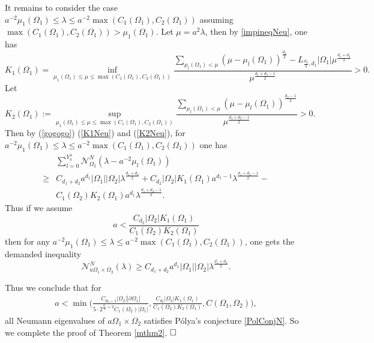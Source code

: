 \documentclass[11pt,letterpaper]{amsart}
\numberwithin{equation}{section}
\theoremstyle{plain}
\theoremstyle{plain}
\numberwithin{equation}{section}
\theoremstyle{remark}
\begin{document}
	
	It remains to consider the case $a^{-2} \mu_1(\Omega_1)\le \lambda\le a^{-2}\max(C_1(\Omega_1), C_2(\Omega_1))$ assuming $\max(C_1(\Omega_1), C_2(\Omega_1))> \mu_1(\Omega_1)$.
	Let $\mu= a^2\lambda$, then by \eqref{impineqNeu}, one has
	\begin{equation} \label{K1Neu}
		K_1(\Omega_1)= \inf_{\mu_1(\Omega_1)\le \mu\le \max(C_1(\Omega_1), C_2(\Omega_1))}\frac{\underset{\mu_l(\Omega_1)<\mu}{\sum}(\mu- \mu_l(\Omega_1))^{\frac{d_2}{2}}- L_{\frac{d_2}{2},d_1} |\Omega_1| \mu^{\frac{d_1+d_2}{2}}}{\mu^{\frac{d_1+d_2-1}{2}}}>0.
	\end{equation} 
	Let 
	\begin{equation} \label{K2Neu}
		K_2(\Omega_1):= \sup_{\mu_1(\Omega_1)\le \mu\le \max(C_1(\Omega_1), C_2(\Omega_1))} \frac{\underset{\mu_l(\Omega_1)<\mu}{\sum}(\mu- \mu_l(\Omega_1))^{\frac{d_2-1}{2}}}{\mu^{\frac{d_1+d_2-1}{2}}}>0.
	\end{equation}
	Then by (\ref{gogogo}) (\ref{K1Neu}) and (\ref{K2Neu}), for $a^{-2} \mu_1(\Omega_1)\le \lambda\le a^{-2}\max(C_1(\Omega_1), C_2(\Omega_1))$ one has 
	\[
	\begin{aligned}
		&\sum_{l=0}^{Y_a^\lambda} \mathcal N^N_{\Omega_2} (\lambda- a^{-2}\mu_l(\Omega_1))\\
		\ge&C_{d_1+d_2}a^{d_1}|\Omega_1||\Omega_2|\lambda^{\frac{d_1+d_2}{2}}+ C_{d_2}|\Omega_2| K_1(\Omega_1) a^{d_1-1} \lambda^{\frac{d_1+d_2-1}{2}}-\\
		&C_1(\Omega_2)K_2(\Omega_1) a^{d_1}\lambda^{\frac{d_1+d_2-1}{2}}.
	\end{aligned}
	\]
	Thus if we assume
	\[
	a< \frac{C_{d_2}|\Omega_2| K_1(\Omega_1)}{C_1(\Omega_2)K_2(\Omega_1)}
	\]
	then for any $a^{-2} \mu_1(\Omega_1)\le \lambda\le a^{-2}\max(C_1(\Omega_1), C_2(\Omega_1))$, one gets the demanded inequality
	\[
	\mathcal N^N_{a\Omega_1\times \Omega_2}(\lambda)\ge C_{d_1+d_2}a^{d_1}|\Omega_1||\Omega_2|\lambda^{\frac{d_1+d_2}{2}}.
	\]
	
	
	Thus we conclude that for 
	\[
	\begin{aligned}
		a< \min\bigg(\frac{C_{d_2-1}|\Omega_2||\partial \Omega_1|}{5 \cdot 2^{\frac{d_1}{2}+2} C_1(\Omega_2)|\Omega_1|}, \frac{C_{d_2}|\Omega_2| K_1(\Omega_1)}{C_1(\Omega_2)K_2(\Omega_1)}, C(\Omega_1,\Omega_2)\bigg),
	\end{aligned}
	\]
	all Neumann eigenvalues of $a\Omega_1\times \Omega_2$ satisfies P\'olya's conjecture \eqref{PolConjN}.  So we complete the proof of Theorem \ref{mthm2}.  $\hfill\square$
	
\end{document}
